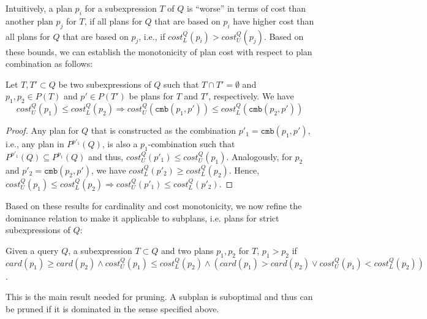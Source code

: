 Intuitively, a plan $p_i$ for a subexpression $T$ of $Q$ is ``worse''
in terms of cost than another plan $p_j$ for $T$, if all plans for $Q$
that are based on $p_i$ have higher cost than all plans for $Q$ that
are based on $p_j$, i.e., if $cost_L^Q(p_i) > cost_U^Q(p_j)$. Based on
these bounds, we can establish the monotonicity of plan cost with
respect to plan combination as follows:
  
\begin{lemma}
  Let $T,T' \subset Q$ be two subexpressions of $Q$ such that $T \cap
  T' = \emptyset$ and $p_1,p_2 \in P(T)$ and $p' \in P(T')$ be plans
  for $T$ and $T'$, respectively. We have
    \[ cost^Q_U(p_1) \leq cost^Q_L(p_2) \Rightarrow
    cost^Q_U(\mathtt{cmb}(p_1,p')) \leq
    cost^Q_L(\mathtt{cmb}(p_2,p')) \]
\end{lemma}
\begin{proof}
  Any plan for $Q$ that is
  constructed as the combination $p'_1 = \mathtt{cmb}(p_1,p')$, i.e.,
  any plan in $P^{p'_1}(Q)$, is also a $p_1$-combination %
such that $P^{p'_1}(Q) \subseteq P^{p_1}(Q)$ and thus, $cost^Q_U(p'_1) \leq
  cost^Q_U(p_1)$. Analogously, for $p_2$ and $p'_2 = \mathtt{cmb}(p_2,p')$, we have $cost^Q_L(p'_2) \geq cost^Q_L(p_2)$. Hence, $cost^Q_U(p_1) \leq cost^Q_L(p_2) \Rightarrow
  cost^Q_U(p'_1) \leq cost^Q_L(p'_2)$. 
\end{proof}

Based on these results for cardinality and cost monotonicity, we now
refine the dominance relation to make it applicable to subplans,
i.e. plans for strict subexpressions of $Q$:

\begin{theorem}
  \label{def:dominates_bound}
  Given a query $Q$, a subexpression $T \subset Q$ and two plans
  $p_1,p_2$ for $T$, $p_1 > p_2$ if
  $card(p_1) \geq card(p_2) \wedge cost_U^Q(p_1) \leq cost_L^Q(p_2)
  \wedge (card(p_1) > card(p_2) \vee cost_U^Q(p_1) < cost_L^Q(p_2))$.
\end{theorem}

This is the main result needed for pruning. A subplan is suboptimal
and thus can be pruned if it is dominated in the sense specified
above.


